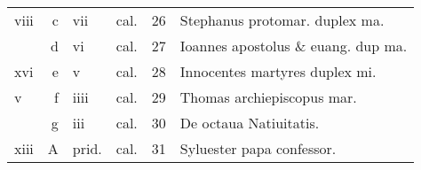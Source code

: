 \documentclass[a5paper,10pt]{book}
\begin{document}
\begin{center}
\begin{tabular}{l r l r r l}
viii & c & vii & cal. & 26 & \color{red} Stephanus protomar. duplex ma. \color{black} \\
 & d & vi & cal. & 27 & \color{red} Ioannes apostolus \& euang. dup ma. \color{black} \\
xvi & e & v & cal. & 28 & \color{red} Innocentes martyres duplex mi. \color{black} \\
v & f & iiii & cal. & 29 & \color{red} Thomas archiepiscopus mar. \color{black} \\
 & g & iii & cal. & 30 & De octaua Natiuitatis. \color{black} \\
xiii & \color{red} A & \color{red} prid. & cal. & 31 & Syluester papa confessor. \color{black} \\
\end{tabular}
\end{center}
\end{document}
